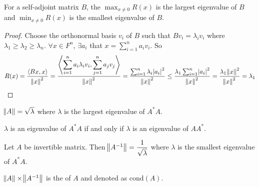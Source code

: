 \begin{theorem}
For a self-adjoint matrix $B$, the $\displaystyle \max_{x \neq 0} R(x)$ is the largest eigenvalue of $B$ and $\displaystyle \min_{x \neq 0} R(x)$ is the smallest eigenvalue of $B$.
\end{theorem}
\begin{proof}
    Choose the orthonormal basis $v_i$ of $B$ such that $Bv_i = \lambda_i v_i$ where $\lambda_1 \geq \lambda_2 \geq \lambda_n$. $\forall x \in F^n$, $\exists a_i$ that $\displaystyle x = \sum_{i=1}^n a_i v_i$. So
    \begin{equation*}
        R(x) = \frac{\innerproduct{Bx}{x}}{\norm{x}^2} = \frac{\innerproduct{\sum_{i=1}^n a_i \lambda_i v_i}{\sum_{j=1}^n a_j v_j}}{\norm{x}^2} = \frac{\sum_{i=1}^n \lambda_i \absolutevalue{a_i}^2}{\norm{x}^2} \leq \frac{\lambda_1 \sum_{i=1}^n \absolutevalue{a_i}^2}{\norm{x}^2} = \frac{\lambda_1 \norm{x}^2}{\norm{x}^2} = \lambda_1
    \end{equation*}
\end{proof}

\begin{theorem}
    $\norm{A} = \sqrt{\lambda}$ where $\lambda$ is the largest eigenvalue of $A^* A$.
\end{theorem}

\begin{theorem}
    $\lambda$ is an eigenvalue of $A^* A$ if and only if $\lambda$ is an eigenvalue of $AA^*$.
\end{theorem}

\begin{theorem}
    Let $A$ be invertible matrix. Then $\norm{A^{-1}} = \dfrac{1}{\sqrt{\lambda}}$ where $\lambda$ is the smallest eigenvalue of $A^*A$.
\end{theorem}

\begin{definition}
    $\norm{A} \times \norm{A^{-1}}$ is the  of $A$ and denoted as $\text{cond}(A)$.
\end{definition}

